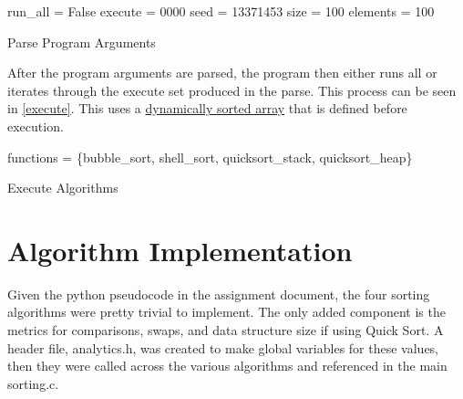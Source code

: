 \documentclass[12pt]{article}
\begin{document}
    \begin{algorithm}
        run\_all = False\;
		execute = 0000
        seed = 13371453
        size = 100
        elements = 100

        \caption{Parse Program Arguments}\label{parse}
    \end{algorithm}

    After the program arguments are parsed, the program then either runs all or iterates through the execute set produced in the parse.
	This process can be seen in \vref{execute}. 
    This uses a \href{https://www.geeksforgeeks.org/dynamic-memory-allocation-in-c-using-malloc-calloc-free-and-realloc/}{dynamically sorted array} that is defined before execution.

    \begin{algorithm}
		functions = \{bubble\_sort, shell\_sort, quicksort\_stack, quicksort\_heap\}\;

        \caption{Execute Algorithms}\label{execute}
    \end{algorithm}

    \section{Algorithm Implementation}

	Given the python pseudocode in the assignment document, the four sorting algorithms were pretty trivial to implement.
	The only added component is the metrics for comparisons, swaps, and data structure size if using Quick Sort.
	A header file, analytics.h, was created to make global variables for these values,
	then they were called across the various algorithms and referenced in the main sorting.c.
\end{document}
